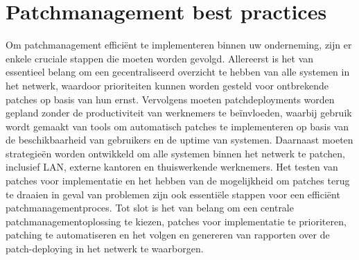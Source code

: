\section{Patchmanagement best practices}
Om patchmanagement efficiënt te implementeren binnen uw onderneming, zijn er enkele cruciale stappen die moeten worden gevolgd. Allereerst is het van essentieel belang om een gecentraliseerd overzicht te hebben van alle systemen in het netwerk, waardoor prioriteiten kunnen worden gesteld voor ontbrekende patches op basis van hun ernst. Vervolgens moeten patchdeployments worden gepland zonder de productiviteit van werknemers te beïnvloeden, waarbij gebruik wordt gemaakt van tools om automatisch patches te implementeren op basis van de beschikbaarheid van gebruikers en de uptime van systemen. Daarnaast moeten strategieën worden ontwikkeld om alle systemen binnen het netwerk te patchen, inclusief LAN, externe kantoren en thuiswerkende werknemers. Het testen van patches voor implementatie en het hebben van de mogelijkheid om patches terug te draaien in geval van problemen zijn ook essentiële stappen voor een efficiënt patchmanagementproces. Tot slot is het van belang om een centrale patchmanagementoplossing te kiezen, patches voor implementatie te prioriteren, patching te automatiseren en het volgen en genereren van rapporten over de patch-deploying in het netwerk te waarborgen. \autocite{ManageEngine2024}